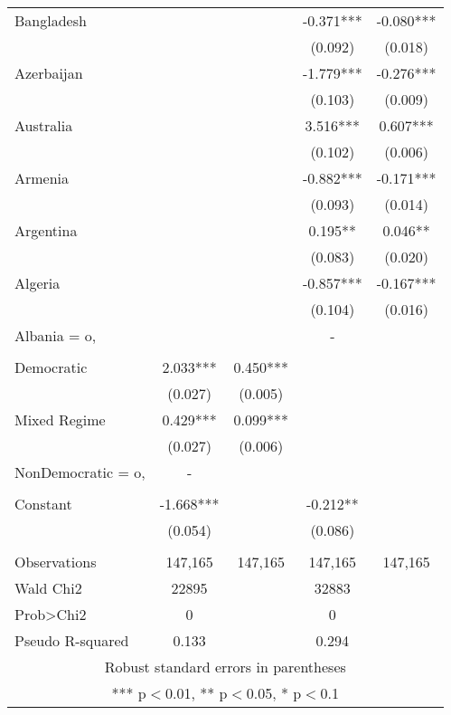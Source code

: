 \documentclass[]{article}
\begin{document}
\begin{tabular}{lcccc}
Bangladesh &  &  & -0.371*** & -0.080*** \\
 &  &  & (0.092) & (0.018) \\
Azerbaijan &  &  & -1.779*** & -0.276*** \\
 &  &  & (0.103) & (0.009) \\
Australia &  &  & 3.516*** & 0.607*** \\
 &  &  & (0.102) & (0.006) \\
Armenia &  &  & -0.882*** & -0.171*** \\
 &  &  & (0.093) & (0.014) \\
Argentina &  &  & 0.195** & 0.046** \\
 &  &  & (0.083) & (0.020) \\
Algeria &  &  & -0.857*** & -0.167*** \\
 &  &  & (0.104) & (0.016) \\
Albania = o, &  &  & - &  \\
 &  &  &  &  \\
Democratic & 2.033*** & 0.450*** &  &  \\
 & (0.027) & (0.005) &  &  \\
Mixed Regime & 0.429*** & 0.099*** &  &  \\
 & (0.027) & (0.006) &  &  \\
NonDemocratic = o, & - &  &  &  \\
 &  &  &  &  \\
Constant & -1.668*** &  & -0.212** &  \\
 & (0.054) &  & (0.086) &  \\
 &  &  &  &  \\
Observations & 147,165 & 147,165 & 147,165 & 147,165 \\
Wald Chi2 & 22895 &  & 32883 &  \\
Prob>Chi2 & 0 &  & 0 &  \\
 Pseudo R-squared & 0.133 &  & 0.294 &  \\ \hline
\multicolumn{5}{c}{ Robust standard errors in parentheses} \\
\multicolumn{5}{c}{ *** p$<$0.01, ** p$<$0.05, * p$<$0.1} \\
\end{tabular}
\end{document}
